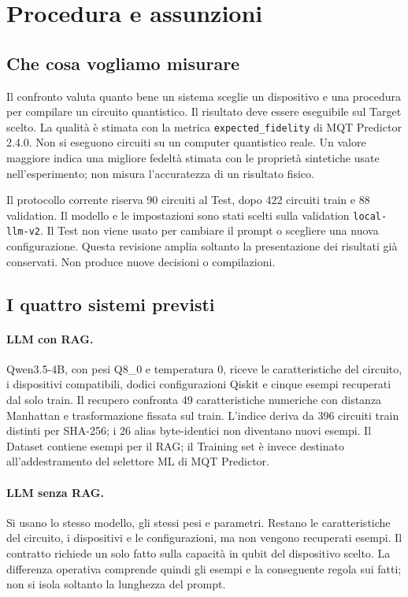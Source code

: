 \section{Procedura e assunzioni}
\subsection{Che cosa vogliamo misurare}
Il confronto valuta quanto bene un sistema sceglie un dispositivo e una procedura
per compilare un circuito quantistico. Il risultato deve essere eseguibile sul
Target scelto. La qualità è stimata con la metrica \texttt{expected\_fidelity}
di MQT Predictor 2.4.0. Non si eseguono circuiti su un computer quantistico reale.
Un valore maggiore indica una migliore fedeltà stimata con le proprietà sintetiche
usate nell'esperimento; non misura l'accuratezza di un risultato fisico.

Il protocollo corrente riserva 90 circuiti al Test, dopo 422 circuiti train e 88
validation. Il modello e le impostazioni sono stati scelti sulla validation
\texttt{local-llm-v2}. Il Test non viene usato per cambiare il prompt o scegliere
una nuova configurazione. Questa revisione amplia soltanto la presentazione
dei risultati già conservati. Non produce nuove decisioni o compilazioni.

\subsection{I quattro sistemi previsti}
\paragraph{LLM con RAG.}
Qwen3.5-4B, con pesi Q8\_0 e temperatura 0, riceve le caratteristiche del circuito,
i dispositivi compatibili, dodici configurazioni Qiskit e cinque esempi recuperati
dal solo train. Il recupero confronta 49 caratteristiche numeriche con distanza
Manhattan e trasformazione fissata sul train. L'indice deriva da 396 circuiti
train distinti per SHA-256; i 26 alias byte-identici non diventano nuovi esempi.
Il Dataset contiene esempi per il RAG; il Training set è invece destinato
all'addestramento del selettore ML di MQT Predictor.

\paragraph{LLM senza RAG.}
Si usano lo stesso modello, gli stessi pesi e parametri. Restano le caratteristiche
del circuito, i dispositivi e le configurazioni, ma non vengono recuperati esempi.
Il contratto richiede un solo fatto sulla capacità in qubit del dispositivo scelto.
La differenza operativa comprende quindi gli esempi e la conseguente regola sui
fatti; non si isola soltanto la lunghezza del prompt.

